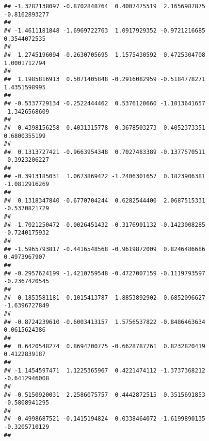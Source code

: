 \documentclass[]{article}
\begin{document}
\begin{verbatim}
## -1.3282138097 -0.8702848764  0.4007475519  2.1656987875 -0.8162893277 
##                                                                       
## -1.4611181848 -1.6969722763  1.0917929352 -0.9721216685  0.3544072535 
##                                                                       
##  1.2745196094 -0.2630705695  1.1575430592  0.4725304708  1.0001712794 
##                                                                       
##  1.1985816913  0.5071405848 -0.2916082959 -0.5184778271  1.4351598995 
##                                                                       
## -0.5337729134 -0.2522444462  0.5376120660 -1.1013641657 -1.3426568609 
##                                                                       
## -0.4398156258  0.4031315778 -0.3678503273 -0.4052373351  0.6800355199 
##                                                                       
##  0.1313727421 -0.9663954348  0.7027483389 -0.1377570511 -0.3923206227 
##                                                                       
## -0.3913185031  1.0673869422 -1.2406301657  0.1823906381 -1.0812916269 
##                                                                       
##  0.1318347840 -0.6770704244  0.6282544400  2.0687515331 -0.5370821729 
##                                                                       
## -1.7021250472 -0.0026451432 -0.3176901132 -0.1423008285 -0.7240175932 
##                                                                       
## -1.5965793817 -0.4416548568 -0.9619872009  0.8246486686  0.4973967907 
##                                                                       
## -0.2957624199 -1.4210759548 -0.4727007159 -0.1119793597 -0.2367420545 
##                                                                       
##  0.1853581181  0.1015413787 -1.8853892902  0.6852096627 -1.6396727849 
##                                                                       
## -0.8724239610 -0.6003413157  1.5756537822 -0.8486463634  0.0615624386 
##                                                                       
##  0.6420548274  0.8694200775 -0.6628787761  0.8232820419  0.4122839187 
##                                                                       
## -1.1454597471  1.1225365967  0.4221474112 -1.3737368212 -0.6412946008 
##                                                                       
## -0.5150920031  2.2586075757  0.4442872515  0.3515691853 -0.5808941295 
##                                                                       
## -0.4998687521 -0.1415194824  0.0338464072 -1.6199890135 -0.3205710129 
##                                                                       

\end{verbatim}
\end{document}
